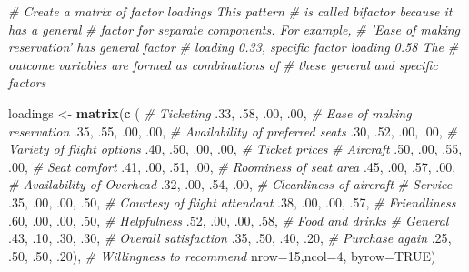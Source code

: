 \documentclass[12pt,]{krantz}
\makeatletter
\newenvironment{Shaded}{\begin{snugshade}}{\end{snugshade}}
\newcommand{\CommentTok}[1]{\textcolor[rgb]{0.37,0.37,0.37}{\textit{#1}}}
\newcommand{\DataTypeTok}[1]{\textcolor[rgb]{0.27,0.27,0.27}{#1}}
\newcommand{\DecValTok}[1]{\textcolor[rgb]{0.06,0.06,0.06}{#1}}
\newcommand{\FloatTok}[1]{\textcolor[rgb]{0.06,0.06,0.06}{#1}}
\newcommand{\KeywordTok}[1]{\textcolor[rgb]{0.27,0.27,0.27}{\textbf{#1}}}
\newcommand{\NormalTok}[1]{#1}
\newcommand{\OtherTok}[1]{\textcolor[rgb]{0.37,0.37,0.37}{#1}}
\newcommand{\StringTok}[1]{\textcolor[rgb]{0.5,0.5,0.5}{#1}}
\newenvironment{kframe}{%
\medskip{}
\setlength{\fboxsep}{.8em}
 \def\at@end@of@kframe{}%
 \ifinner\ifhmode%
  \def\at@end@of@kframe{\end{minipage}}%
  \begin{minipage}{\columnwidth}%
 \fi\fi%
 \def\FrameCommand##1{\hskip\@totalleftmargin \hskip-\fboxsep
 \colorbox{shadecolor}{##1}\hskip-\fboxsep
     \hskip-\linewidth \hskip-\@totalleftmargin \hskip\columnwidth}%
 \MakeFramed {\advance\hsize-\width
   \@totalleftmargin\z@ \linewidth\hsize
   \@setminipage}}%
 {\par\unskip\endMakeFramed%
 \at@end@of@kframe}
\renewenvironment{Shaded}{\begin{kframe}}{\end{kframe}}
\makeatother
\begin{document}
\begin{Shaded}
\begin{Highlighting}[]
\CommentTok{# Create a matrix of factor loadings This pattern}
\CommentTok{# is called bifactor because it has a general}
\CommentTok{# factor for separate components.  For example,}
\CommentTok{# 'Ease of making reservation' has general factor}
\CommentTok{# loading 0.33, specific factor loading 0.58 The}
\CommentTok{# outcome variables are formed as combinations of}
\CommentTok{# these general and specific factors}

\NormalTok{loadings <-}\StringTok{ }\KeywordTok{matrix}\NormalTok{(}\KeywordTok{c}\NormalTok{ ( }
  \CommentTok{# Ticketing}
  \FloatTok{.33}\NormalTok{, }\FloatTok{.58}\NormalTok{, }\FloatTok{.00}\NormalTok{, }\FloatTok{.00}\NormalTok{,  }\CommentTok{# Ease of making reservation }
  \FloatTok{.35}\NormalTok{, }\FloatTok{.55}\NormalTok{, }\FloatTok{.00}\NormalTok{, }\FloatTok{.00}\NormalTok{,  }\CommentTok{# Availability of preferred seats}
  \FloatTok{.30}\NormalTok{, }\FloatTok{.52}\NormalTok{, }\FloatTok{.00}\NormalTok{, }\FloatTok{.00}\NormalTok{,  }\CommentTok{# Variety of flight options}
  \FloatTok{.40}\NormalTok{, }\FloatTok{.50}\NormalTok{, }\FloatTok{.00}\NormalTok{, }\FloatTok{.00}\NormalTok{,  }\CommentTok{# Ticket prices}
  \CommentTok{# Aircraft}
  \FloatTok{.50}\NormalTok{, }\FloatTok{.00}\NormalTok{, }\FloatTok{.55}\NormalTok{, }\FloatTok{.00}\NormalTok{,  }\CommentTok{# Seat comfort}
  \FloatTok{.41}\NormalTok{, }\FloatTok{.00}\NormalTok{, }\FloatTok{.51}\NormalTok{, }\FloatTok{.00}\NormalTok{,  }\CommentTok{# Roominess of seat area}
  \FloatTok{.45}\NormalTok{, }\FloatTok{.00}\NormalTok{, }\FloatTok{.57}\NormalTok{, }\FloatTok{.00}\NormalTok{,  }\CommentTok{# Availability of Overhead}
  \FloatTok{.32}\NormalTok{, }\FloatTok{.00}\NormalTok{, }\FloatTok{.54}\NormalTok{, }\FloatTok{.00}\NormalTok{,  }\CommentTok{# Cleanliness of aircraft}
  \CommentTok{# Service}
  \FloatTok{.35}\NormalTok{, }\FloatTok{.00}\NormalTok{, }\FloatTok{.00}\NormalTok{, }\FloatTok{.50}\NormalTok{,  }\CommentTok{# Courtesy of flight attendant}
  \FloatTok{.38}\NormalTok{, }\FloatTok{.00}\NormalTok{, }\FloatTok{.00}\NormalTok{, }\FloatTok{.57}\NormalTok{,  }\CommentTok{# Friendliness}
  \FloatTok{.60}\NormalTok{, }\FloatTok{.00}\NormalTok{, }\FloatTok{.00}\NormalTok{, }\FloatTok{.50}\NormalTok{,  }\CommentTok{# Helpfulness}
  \FloatTok{.52}\NormalTok{, }\FloatTok{.00}\NormalTok{, }\FloatTok{.00}\NormalTok{, }\FloatTok{.58}\NormalTok{,  }\CommentTok{# Food and drinks}
  \CommentTok{# General   }
  \FloatTok{.43}\NormalTok{, }\FloatTok{.10}\NormalTok{, }\FloatTok{.30}\NormalTok{, }\FloatTok{.30}\NormalTok{,  }\CommentTok{# Overall satisfaction}
  \FloatTok{.35}\NormalTok{, }\FloatTok{.50}\NormalTok{, }\FloatTok{.40}\NormalTok{, }\FloatTok{.20}\NormalTok{,  }\CommentTok{# Purchase again}
  \FloatTok{.25}\NormalTok{, }\FloatTok{.50}\NormalTok{, }\FloatTok{.50}\NormalTok{, }\FloatTok{.20}\NormalTok{), }\CommentTok{# Willingness to recommend}
  \DataTypeTok{nrow=}\DecValTok{15}\NormalTok{,}\DataTypeTok{ncol=}\DecValTok{4}\NormalTok{, }\DataTypeTok{byrow=}\OtherTok{TRUE}\NormalTok{)}


\end{Highlighting}
\end{Shaded}
\end{document}
